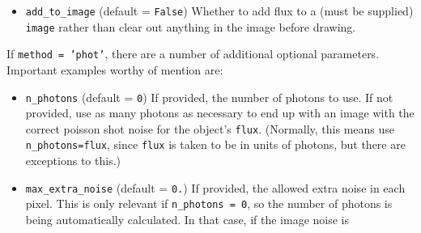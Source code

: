 \documentclass[preprint,10pt]{../../devel/modules/aastex}
\begin{document}
\begin{itemize}
{\begin{itemize}
\begin{itemize}
        if possible.  (It defaults to \texttt{'fft'} when such a procedure is impossible or 
        impractical.)
      \item \texttt{'phot'} renders the image by shooting a finite number of photons.
        The resulting rendering therefore contains stochastic noise, but uses few approximations.
        Note however, that you cannot use \texttt{'phot'} with a \texttt{RealGalaxy} instance.
        This \texttt{method} has a few additional optional parmaeters; see below.
      \item \texttt{'no\_pixel'} does not integrate over the pixel response, but rather samples
        the profile directly at the pixel centers and multiplies by the pixel area.  This is
        the appropriate choice if your PSF already includes the convolution by the pixel response,
        e.g. if it comes from an image of a star observed on the same camera.
      \item \texttt{'sb'} is simlar to \texttt{'no\_pixel'} except that it does not scale the
        values by the pixel area.  So the drawn values will be direct samples of the surface
        brightness at each location.
    \end{itemize}
  \item \texttt{add\_to\_image} (default = \texttt{False}) \newline
    Whether to add flux to a (must be supplied) \texttt{image} rather than clear out
    anything in the image before drawing.
\end{itemize}
If \texttt{method = 'phot'}, there are a number of additional optional parameters. Important
examples worthy of mention are:
\begin{itemize}
  \item \texttt{n\_photons} (default = \texttt{0}) \newline If provided,
    the number of photons to use.  If not provided, use as many photons
    as necessary to end up with an image with the correct poisson shot
    noise for the object's \texttt{flux}.  (Normally, this means use \texttt{n\_photons=flux},
    since \texttt{flux} is taken to be in units of photons, but there are exceptions to this.)
  \item \texttt{max\_extra\_noise} (default = \texttt{0.}) \newline If
    provided, the allowed extra noise in each pixel.  This is only
    relevant if \texttt{n\_photons = 0}, so the number of photons is
    being automatically calculated.  In that case, if the image noise is

\end{itemize}}
\end{itemize}
\end{document}
